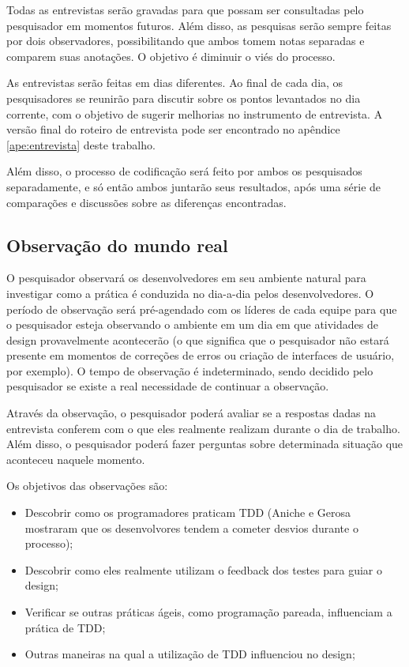 Todas as entrevistas serão gravadas para que possam ser consultadas pelo
pesquisador em momentos futuros. Além disso, as pesquisas serão sempre feitas
por dois observadores, possibilitando que ambos tomem notas separadas e comparem
suas anotações. O objetivo é diminuir o viés do processo.

As entrevistas serão feitas em dias diferentes. Ao final de cada dia, os
pesquisadores se reunirão para discutir sobre os pontos levantados no dia
corrente, com o objetivo de sugerir melhorias no instrumento de entrevista. A
versão final do roteiro de entrevista pode ser encontrado no apêndice 
\ref{ape:entrevista} deste trabalho.

Além disso, o processo de codificação \cite{seaman} será feito por ambos os
pesquisados separadamente, e só então ambos juntarão seus resultados, após uma 
série de comparações e discussões sobre as diferenças encontradas.

\subsection{Observação do mundo real}
\label{sec:planejamento-estrategia-observacao}

O pesquisador observará os desenvolvedores em seu ambiente natural para
investigar como a prática é conduzida no dia-a-dia pelos desenvolvedores. O
período de observação será pré-agendado com os líderes de cada equipe para que
o pesquisador esteja observando o ambiente em um dia em que atividades de 
design provavelmente acontecerão (o que significa que o pesquisador não estará 
presente em momentos de  correções de erros ou criação de interfaces de usuário,
por exemplo). O tempo de observação é indeterminado, sendo decidido pelo 
pesquisador se existe a real necessidade de continuar a observação.

Através da observação, o pesquisador poderá avaliar se
a respostas dadas na entrevista conferem com o que eles realmente realizam 
durante o dia de trabalho. Além disso, o pesquisador poderá fazer perguntas 
sobre determinada situação que aconteceu naquele momento.

Os objetivos das observações são:

\begin{itemize}
	\item Descobrir como os programadores praticam TDD (Aniche e Gerosa 
	\cite{aniche-mistakes} mostraram que os desenvolvores tendem a cometer desvios
	durante o processo);

	\item Descobrir como eles realmente utilizam o feedback dos testes para guiar
	o design;

	\item Verificar se outras práticas ágeis, como programação pareada, 
	influenciam a prática de TDD;

	\item Outras maneiras na qual a utilização de TDD influenciou no design;
\end{itemize}

